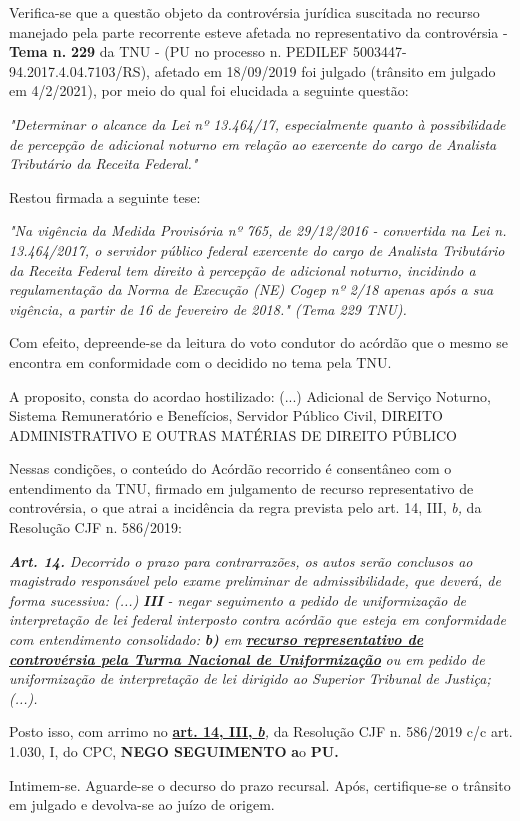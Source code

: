 \documentclass[12pt]{article}
\begin{document}
\justifying
\noindent Verifica-se que a questão objeto da controvérsia jurídica suscitada no recurso manejado pela parte recorrente esteve afetada no representativo da controvérsia - \textbf{Tema n. }\textbf{229} da TNU - (PU no processo n. PEDILEF 5003447-94.2017.4.04.7103/RS),  afetado em 18/09/2019 foi julgado (trânsito em julgado em 4/2/2021), por meio do qual foi elucidada a seguinte questão:

\noindent \textit{"Determinar o alcance da Lei nº 13.464/17, especialmente quanto à possibilidade de percepção de adicional noturno em relação ao exercente do cargo de Analista Tributário da Receita Federal."}

\noindent Restou firmada a seguinte tese:

\noindent \textit{"Na vigência da Medida Provisória nº 765, de 29/12/2016 - convertida na Lei n. 13.464/2017, o servidor público federal exercente do cargo de Analista Tributário da Receita Federal tem direito à percepção de adicional noturno, incidindo a regulamentação da Norma de Execução (NE) Cogep nº 2/18 apenas após a sua vigência, a partir de 16 de fevereiro de 2018." (Tema 229 TNU).}

\noindent Com efeito, depreende-se da leitura do voto condutor do acórdão que o mesmo se encontra em conformidade com o decidido no  tema pela TNU.

\noindent A proposito, consta do acordao hostilizado: (...) Adicional de Serviço Noturno, Sistema Remuneratório e Benefícios, Servidor Público Civil, DIREITO ADMINISTRATIVO E OUTRAS MATÉRIAS DE DIREITO PÚBLICO

\noindent Nessas condições, o conteúdo do Acórdão recorrido é consentâneo com o entendimento da TNU, firmado em julgamento de recurso representativo de controvérsia, o que atrai a incidência da regra prevista pelo art. 14, III, \textit{b,} da Resolução CJF n. 586/2019:

\noindent \textit{\textbf{Art. 14.}}\textit{ Decorrido o prazo para contrarrazões, os autos serão conclusos ao magistrado responsável pelo exame preliminar de admissibilidade, que deverá, de forma sucessiva: (...) }\textit{\textbf{III }}\textit{- negar seguimento a pedido de uniformização de interpretação de lei federal interposto contra acórdão que esteja em conformidade com entendimento consolidado: }\textit{\textbf{b)}}\textit{ em }\uline{\textit{\textbf{recurso representativo de controvérsia pela Turma Nacional de Uniformização}}}\textit{ ou em pedido de uniformização de interpretação de lei dirigido ao Superior Tribunal de Justiça;(...).}

\noindent Posto isso, com arrimo no \uline{\textbf{art. 14, III, }}\uline{\textit{\textbf{b}}}\textit{,} da Resolução CJF n. 586/2019 c/c art. 1.030, I, do CPC, \textbf{NEGO SEGUIMENTO }\textbf{a}o\textbf{ PU}\textbf{.}

\noindent Intimem-se. Aguarde-se o decurso do prazo recursal. Após, certifique-se o trânsito em julgado e devolva-se ao juízo de origem.
\end{document}
